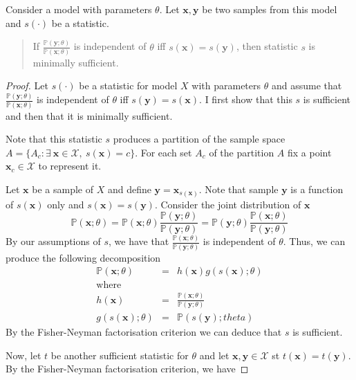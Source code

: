 \documentclass[bibliography=totoc,11pt,a4paper,margin=0]{article}
\newcommand*{\prob}{\mathbb{P}}
\theoremstyle{break}
\begin{document}
  \begin{box_theorem}\label{the_condition_for_minimal_sufficiency}
    Consider a model with parameters $\theta$. Let $\mathbf{x},\mathbf{y}$ be two samples from this model and $s(\cdot)$ be a statistic.
    \begin{quote}
      If $\frac{\prob(\mathbf{y};\theta)}{\prob(\mathbf{x};\theta)}$ is independent of $\theta$ iff $s(\mathbf{x})=s(\mathbf{y})$, then statistic $s$ is minimally sufficient.
    \end{quote}
    \begin{proof}
      Let $s(\cdot)$ be a statistic for model $X$ with parameters $\theta$ and assume that $\frac{\prob(\mathbf{y};\theta)}{\prob(\mathbf{x};\theta)}$ is independent of $\theta$ iff $s(\mathbf{y})=s(\mathbf{x})$. I first show that this $s$ is sufficient and then that it is minimally sufficient.
      \par Note that this statistic $s$ produces a partition of the sample space $A=\{A_c:\exists\ \mathbf{x}\in\mathcal{X},\ s(\mathbf{x})=c\}$. For each set $A_c$ of the partition $A$ fix a point $\mathbf{x}_c\in\mathcal{X}$ to represent it.
      \par Let $\mathbf{x}$ be a sample of $X$ and define $\mathbf{y}=\mathbf{x}_{s(\mathbf{x})}$. Note that sample $\mathbf{y}$ is a function of $s(\mathbf{x})$ only and $s(\mathbf{x})=s(\mathbf{y})$. Consider the joint distribution of $\mathbf{x}$
      \[\prob(\mathbf{x};\theta)=\prob(\mathbf{x};\theta)\frac{\prob(\mathbf{y};\theta)}{\prob(\mathbf{y};\theta)}=\prob(\mathbf{y};\theta)\frac{\prob(\mathbf{x};\theta)}{\prob(\mathbf{y};\theta)} \]
      By our assumptions of $s$, we have that $\frac{\prob(\mathbf{x};\theta)}{\prob(\mathbf{y};\theta)}$ is independent of $\theta$. Thus, we can produce the following decomposition
      \[\begin{array}{rcl}
        \prob(\mathbf{x};\theta)&=&h(\mathbf{x})g(s(\mathbf{x});\theta)\\
        \text{where}&\\
        h(\mathbf{x})&=&\frac{\prob(\mathbf{x};\theta)}{\prob(\mathbf{y};\theta)}\\
        g(s(\mathbf{x});\theta)&=&\prob(s(\mathbf{y});theta)
      \end{array}\]
      By the Fisher-Neyman factorisation criterion we can deduce that $s$ is sufficient.
      \par Now, let $t$ be another sufficient statistic for $\theta$ and let $\mathbf{x},\mathbf{y}\in\mathcal{X}$ st $t(\mathbf{x})=t(\mathbf{y})$. By the Fisher-Neyman factorisation criterion, we have

\end{proof}
\end{box_theorem}
\end{document}
